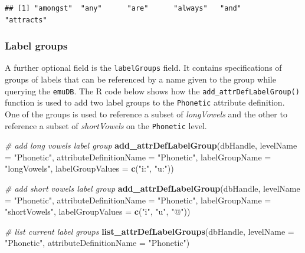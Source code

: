 \documentclass[]{book}
\newenvironment{Shaded}{\begin{snugshade}}{\end{snugshade}}
\newcommand{\CommentTok}[1]{\textcolor[rgb]{0.56,0.35,0.01}{\textit{#1}}}
\newcommand{\DataTypeTok}[1]{\textcolor[rgb]{0.13,0.29,0.53}{#1}}
\newcommand{\KeywordTok}[1]{\textcolor[rgb]{0.13,0.29,0.53}{\textbf{#1}}}
\newcommand{\NormalTok}[1]{#1}
\newcommand{\StringTok}[1]{\textcolor[rgb]{0.31,0.60,0.02}{#1}}
\begin{document}
\begin{verbatim}
## [1] "amongst"  "any"      "are"      "always"   "and"      "attracts"
\end{verbatim}

\hypertarget{label-groups}{%
\subsubsection{Label groups}\label{label-groups}}

A further optional field is the \texttt{labelGroups} field. It contains specifications of groups of labels that can be referenced by a name given to the group while querying the \texttt{emuDB}. The R code below shows how the \texttt{add\_attrDefLabelGroup()} function is used to add two label groups to the \texttt{Phonetic} attribute definition. One of the groups is used to reference a subset of \emph{longVowels} and the other to reference a subset of \emph{shortVowels} on the \texttt{Phonetic} level.

\begin{Shaded}
\begin{Highlighting}[]
\CommentTok{# add long vowels label group}
\KeywordTok{add_attrDefLabelGroup}\NormalTok{(dbHandle,}
                      \DataTypeTok{levelName =} \StringTok{"Phonetic"}\NormalTok{,}
                      \DataTypeTok{attributeDefinitionName =} \StringTok{"Phonetic"}\NormalTok{,}
                      \DataTypeTok{labelGroupName =} \StringTok{"longVowels"}\NormalTok{,}
                      \DataTypeTok{labelGroupValues =} \KeywordTok{c}\NormalTok{(}\StringTok{"i:"}\NormalTok{, }\StringTok{"u:"}\NormalTok{))}

\CommentTok{# add short vowels label group}
\KeywordTok{add_attrDefLabelGroup}\NormalTok{(dbHandle,}
                      \DataTypeTok{levelName =} \StringTok{"Phonetic"}\NormalTok{,}
                      \DataTypeTok{attributeDefinitionName =} \StringTok{"Phonetic"}\NormalTok{,}
                      \DataTypeTok{labelGroupName =} \StringTok{"shortVowels"}\NormalTok{,}
                      \DataTypeTok{labelGroupValues =} \KeywordTok{c}\NormalTok{(}\StringTok{"i"}\NormalTok{, }\StringTok{"u"}\NormalTok{, }\StringTok{"@"}\NormalTok{))}


\CommentTok{# list current label groups}
\KeywordTok{list_attrDefLabelGroups}\NormalTok{(dbHandle,}
                        \DataTypeTok{levelName =} \StringTok{"Phonetic"}\NormalTok{,}
                        \DataTypeTok{attributeDefinitionName =} \StringTok{"Phonetic"}\NormalTok{)}
\end{Highlighting}
\end{Shaded}
\end{document}
